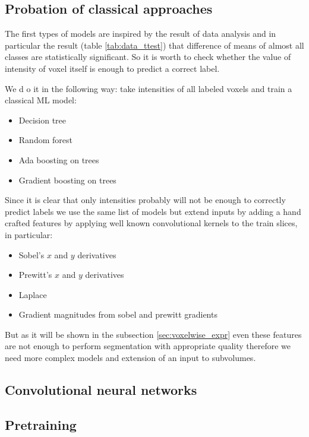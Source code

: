 \documentclass[twocolumn, a4paper]{article}
\theoremstyle{definition}
\begin{document}
\subsection{Probation of classical approaches}
The first types of models are inspired by the result of data analysis and in particular the result
(table \ref{tab:data_ttest}) that difference of means of almost all classes are statistically significant.
So it is worth to check whether the value of intensity of voxel itself is enough to predict a correct label.

We d o it in the following way: take intensities of all labeled voxels and train a
classical ML model:
\begin{itemize}
    \item Decision tree \cite{breiman2017classification}
    \item Random forest \cite{breiman2001random}
    \item Ada boosting on trees \cite{hastie2009multi}
    \item Gradient boosting on trees \cite{friedman2001greedy}
\end{itemize}
Since it is clear that only intensities probably will not be enough to correctly predict
labels we use the same list of models but extend inputs by adding a hand crafted features by
applying well known convolutional kernels to the train slices, in particular:
\begin{itemize}
    \item Sobel's \(x \) and \(y\) derivatives
    \item Prewitt's \(x \) and \(y\) derivatives
    \item Laplace
    \item Gradient magnitudes from sobel and prewitt gradients
\end{itemize}
But as it will be shown in the subsection \ref{sec:voxelwise_expr} even these features are
not enough to perform segmentation with appropriate quality therefore we need more complex models
and extension of an input to subvolumes.

\subsection{Convolutional neural networks}

\subsection{Pretraining}
\end{document}
